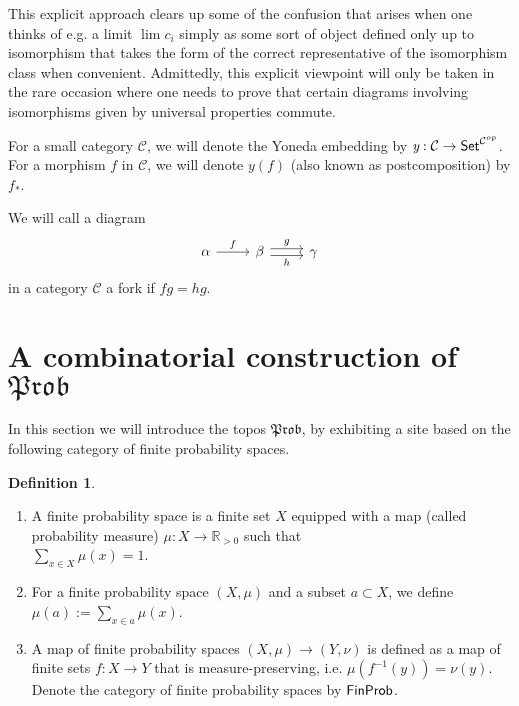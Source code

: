 \documentclass[a4paper]{amsproc}
\theoremstyle{plain}
\theoremstyle{definition}
\newtheorem{definition}[theorem]{Definition}
\theoremstyle{remark}
\numberwithin{equation}{section}
\newcommand{\y}{\textit{y}}
\DeclareMathOperator*{\limit}{lim}
\newcommand{\Set}{\textup{\textsf{Set}}}
\newcommand{\FinProb}{\textup{\textsf{FinProb}}}
\newcommand{\C}{\mathcal{C}}
\newcommand{\Prob}{\mathfrak{Prob}}
\begin{document}
This explicit approach clears up some of the confusion that arises when one thinks of e.g. a limit $\limit c_i$ simply as some sort of object defined only up to isomorphism that takes the form of the correct representative of the isomorphism class when convenient. Admittedly, this explicit viewpoint will only be taken in the rare occasion where one needs to prove that certain diagrams involving isomorphisms given by universal properties commute.

For a small category $\C$, we will denote the Yoneda embedding by $\y: \C \to \Set^{\C^{op}}$. For a morphism $f$ in $\C$, we will denote $\y(f)$ (also known as postcomposition) by $f_*$.

We will call a diagram
\[
\begin{tikzcd}
\alpha \arrow[r, "f"] & \beta \arrow[r, "g", shift left] \arrow[r, "h"', shift right] & \gamma
\end{tikzcd}
\]
in a category $\C$ a fork if $fg = hg$.


\section{A combinatorial construction of $\Prob$}

In this section we will introduce the topos $\Prob$, by exhibiting a site based on the following category of finite probability spaces.

\begin{definition}
\mbox{}
\begin{enumerate}
\item A finite probability space is a finite set $X$ equipped with a map (called probability measure) $\mu: X \to \mathbb{R}_{>0}$ such that \\ $\sum_{x \in X} \mu(x) = 1$.
\item For a finite probability space $(X,\mu)$ and a subset $a \subset X$, we define $\mu(a) := \sum_{x \in a} \mu(x)$.
\item A map of finite probability spaces $(X,\mu) \to (Y,\nu)$ is defined as a map of finite sets $f: X \to Y$ that is measure-preserving, i.e. $\mu(f^{-1}(y)) = \nu(y)$. Denote the category of finite probability spaces by $\FinProb$.
\end{enumerate}
\end{definition}
\end{document}
